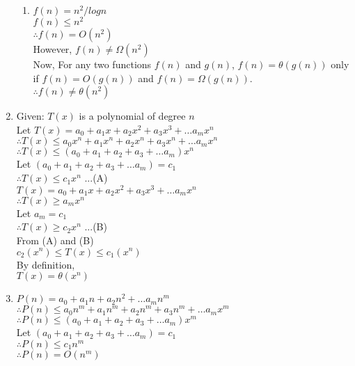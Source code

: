 \documentclass[12pt, a4paper]{article}
\begin{document}
\begin{enumerate}[label=(\alph*)]
\begin{enumerate}[label=(\alph*)]
 		\item $f(n) = n^2/logn$\\
 		$f(n) \leq n^2$\\
 		$\therefore f(n)=O(n^2)$\\
 		However, $f(n) \neq \Omega(n^2)$\\
 		Now, For any two functions $f(n)$ and $g(n)$, $f (n) = \theta(g(n))$ only if
 		$f(n)=O(g(n))$ and $f(n)=\Omega(g(n))$.\\
 		$\therefore f(n) \neq \theta(n^2)$\\
 		
 	\end{enumerate}
 	
 	
 	\item 
 	Given: $T(x)$ is a polynomial of degree $n$\\
 	Let $T(x)=a_0 + a_1 x + a_2 x^2 + a_3 x^3 + \dots a_m x^n$\\
 	$\therefore T(x) \leq a_0 x^n + a_1 x^n + a_2 x^n + a_3 x^n + \dots a_m x^n$\\
 	$\therefore T(x) \leq (a_0 + a_1 + a_2 + a_3 + \dots a_m) x^n$\\
 	Let $(a_0 + a_1 + a_2 + a_3 + \dots a_m) = c_1$\\
 	$\therefore T(x) \leq c_1 x^n$ \hspace{2cm} ...(A)\\
 	
 	$T(x)=a_0 + a_1 x + a_2 x^2 + a_3 x^3 + \dots a_m x^n$\\
 	$\therefore T(x) \geq a_m x^n $\\
 	Let $a_m = c_1$\\
 	$\therefore T(x) \geq c_2 x^n$ \hspace{2cm} ...(B)\\
 	
 	From (A) and (B)\\
 	$c_2(x^n) \leq T(x) \leq c_1(x^n)$\\
 	By definition,\\
 	$T(x) = \theta(x^n)$ 
 	
 	\item 
 	$P (n) = a_0 + a_1 n + a_2 n^2 + \dots a_m n^m $\\
 	$\therefore P(n) \leq a_0 n^m + a_1 n^m + a_2 n^m + a_3 n^m + \dots a_m x^m$\\
 	$\therefore P(n) \leq (a_0 + a_1 + a_2 + a_3 + \dots a_m) x^m$\\
 	Let $(a_0 + a_1 + a_2 + a_3 + \dots a_m) = c_1$\\
 	$\therefore P(n) \leq c_1 n^m$\\
 	$\therefore P(n) = O(n^m)$\\
 	

\end{enumerate}
\end{document}
